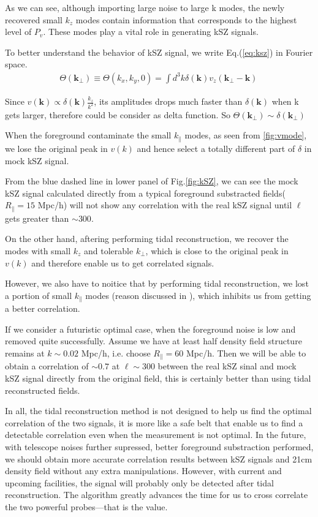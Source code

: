As we can see, although importing large noise to large k modes, 
the newly recovered small $k_z$ modes contain information that
corresponds to the highest level of $P_{v}$. 
These modes play a vital role in generating kSZ signals.

To better understand the behavior of kSZ signal, we write Eq.(\ref{eq:ksz}) in Fourier space.\begin{eqnarray}
\Theta(\bm{k_\perp})\equiv \Theta(k_x,k_y,0)=\int d^3k \delta(\bm{k}) v_z(\bm{k_\perp}-\bm{k})\,
\end{eqnarray}

Since $v(\bm{k})\propto \delta(\bm{k})\frac{k_z}{k^2}$, 
its amplitudes drops much faster than $\delta(\bm{k})$ when k gets larger, 
therefore could be consider as delta function. So $\Theta(\bm{k_\perp})\sim\delta(\bm{k_\perp})$

When the foreground contaminate the small $k_\parallel$ modes, as seen
from \ref{fig:vmode}, we lose the original peak in $v(k)$ and hence
select a totally different part of $\delta$ in mock kSZ signal.

From the blue dashed line in lower panel of Fig.\ref{fig:kSZ}, we can see the mock kSZ
signal calculated directly from a typical foreground substracted
fields($R_\parallel=15$ Mpc/h) will not
show any correlation with the real kSZ signal until $\ell$ gets greater
than $\sim300$.

On the other hand, aftering performing tidal reconstruction, we
recover the modes with small $k_z$ and tolerable $k_\perp$, 
which is close to the original peak in $v(k)$ and therefore enable us to get correlated signals.


However, we also have to noitice that by performing tidal reconstruction, 
we lost a portion of small $k_\parallel$ modes (reason discussed in \cite{2015:zhu}), 
which inhibits us from getting a better correlation.

If we consider a futuristic optimal case, when the foreground noise is
low and removed quite successfully.
Assume we have at least half density field structure remains at $k\sim
0.02$ Mpc/h, i.e. choose $R_\parallel=60$ Mpc/h.
Then we will be able to obtain a correlation of $\sim0.7$ at
$\ell\sim 300$ between the real kSZ sinal and mock kSZ signal directly
from the original field, this is certainly better than using tidal
reconstructed fields.

In all, the tidal reconstruction method is not designed to help us find the optimal correlation of the two signals, 
it is more like a safe belt that enable us to find a detectable correlation even when the measurement is not optimal. 
In the future, with telescope noises further supressed, 
better foreground substraction performed,
we should obtain more accurate correlation results between kSZ
signals and 21cm density field without any extra manipulations.
However, with current and upcoming facilities, the signal will
probably only be detected after tidal reconstruction.
The algorithm greatly advances the time for us to cross correlate
the two powerful probes---that is the value.


